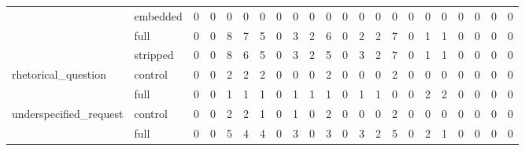 \begin{tabular}{llrrrrrrrrrrrrrrrrrrrr}
 & embedded & 0 & 0 & 0 & 0 & 0 & 0 & 0 & 0 & 0 & 0 & 0 & 0 & 0 & 0 & 0 & 0 & 0 & 0 & 0 & 0 \\
 & full & 0 & 0 & 8 & 7 & 5 & 0 & 3 & 2 & 6 & 0 & 2 & 2 & 7 & 0 & 1 & 1 & 0 & 0 & 0 & 0 \\
 & stripped & 0 & 0 & 8 & 6 & 5 & 0 & 3 & 2 & 5 & 0 & 3 & 2 & 7 & 0 & 1 & 1 & 0 & 0 & 0 & 0 \\
\cline{1-22}
\multirow[t]{2}{*}{rhetorical_question} & control & 0 & 0 & 2 & 2 & 2 & 0 & 0 & 0 & 2 & 0 & 0 & 0 & 2 & 0 & 0 & 0 & 0 & 0 & 0 & 0 \\
 & full & 0 & 0 & 1 & 1 & 1 & 0 & 1 & 1 & 1 & 0 & 1 & 1 & 0 & 0 & 2 & 2 & 0 & 0 & 0 & 0 \\
\cline{1-22}
\multirow[t]{2}{*}{underspecified_request} & control & 0 & 0 & 2 & 2 & 1 & 0 & 1 & 0 & 2 & 0 & 0 & 0 & 2 & 0 & 0 & 0 & 0 & 0 & 0 & 0 \\
 & full & 0 & 0 & 5 & 4 & 4 & 0 & 3 & 0 & 3 & 0 & 3 & 2 & 5 & 0 & 2 & 1 & 0 & 0 & 0 & 0 \\
\cline{1-22}
\bottomrule
\end{tabular}
